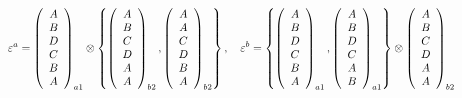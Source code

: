 \documentclass{article}
\begin{document}
\begin{equation}
\scalebox{0.8}{$\begin{aligned}
\varepsilon^{a}=\left(\begin{array}{c}
A\\
B\\
D\\
C\\
B\\
A
\end{array}\right)_{a1}\otimes\left\{ \left(\begin{array}{c}
A\\
B\\
C\\
D\\
A\\
A
\end{array}\right)_{b2},\left(\begin{array}{c}
A\\
A\\
C\\
D\\
B\\
A
\end{array}\right)_{b2}\right\} ,\quad\varepsilon^{b}=\left\{ \left(\begin{array}{c}
A\\
B\\
D\\
C\\
B\\
A
\end{array}\right)_{a1},\left(\begin{array}{c}
A\\
B\\
D\\
C\\
A\\
B
\end{array}\right)_{a1}\right\} \otimes\left(\begin{array}{c}
A\\
B\\
C\\
D\\
A\\
A
\end{array}\right)_{b2}
\end{aligned}$}
\label{eq: sample elementary state spaces}
\end{equation}
\end{document}
